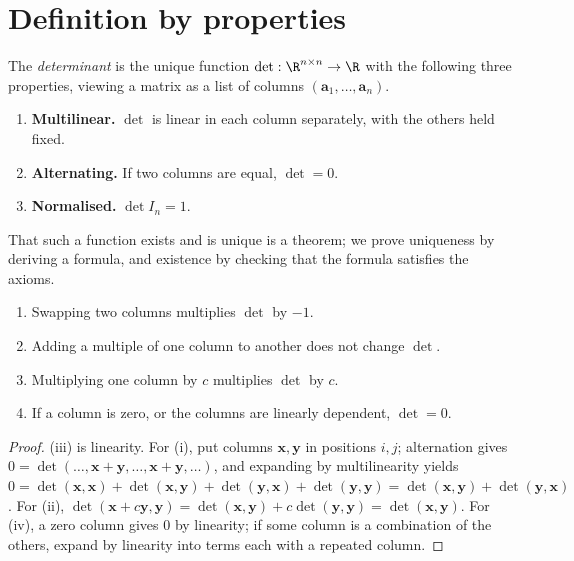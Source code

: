 \section{Definition by properties}

\begin{definition}[Determinant]
The \emph{determinant} is the unique function $\det:\R^{n\times n}\to\R$ with the following three properties, viewing a matrix as a list of columns $(\mathbf{a}_1,\dots,\mathbf{a}_n)$.
\begin{enumerate}[label=(D\arabic*)]
  \item \textbf{Multilinear.} $\det$ is linear in each column separately, with the others held fixed.
  \item \textbf{Alternating.} If two columns are equal, $\det=0$.
  \item \textbf{Normalised.} $\det I_n=1$.
\end{enumerate}
\end{definition}

That such a function exists and is unique is a theorem; we prove uniqueness by deriving a formula, and existence by checking that the formula satisfies the axioms.

\begin{proposition}\label{prop:detconseq}
\begin{enumerate}[label=(\roman*)]
  \item Swapping two columns multiplies $\det$ by $-1$.
  \item Adding a multiple of one column to another does not change $\det$.
  \item Multiplying one column by $c$ multiplies $\det$ by $c$.
  \item If a column is zero, or the columns are linearly dependent, $\det=0$.
\end{enumerate}
\end{proposition}

\begin{proof}
(iii) is linearity. For (i), put columns $\mathbf{x},\mathbf{y}$ in positions $i,j$; alternation gives $0=\det(\dots,\mathbf{x}+\mathbf{y},\dots,\mathbf{x}+\mathbf{y},\dots)$, and expanding by multilinearity yields $0=\det(\mathbf{x},\mathbf{x})+\det(\mathbf{x},\mathbf{y})+\det(\mathbf{y},\mathbf{x})+\det(\mathbf{y},\mathbf{y})=\det(\mathbf{x},\mathbf{y})+\det(\mathbf{y},\mathbf{x})$. For (ii), $\det(\mathbf{x}+c\mathbf{y},\mathbf{y})=\det(\mathbf{x},\mathbf{y})+c\det(\mathbf{y},\mathbf{y})=\det(\mathbf{x},\mathbf{y})$. For (iv), a zero column gives $0$ by linearity; if some column is a combination of the others, expand by linearity into terms each with a repeated column.
\end{proof}

